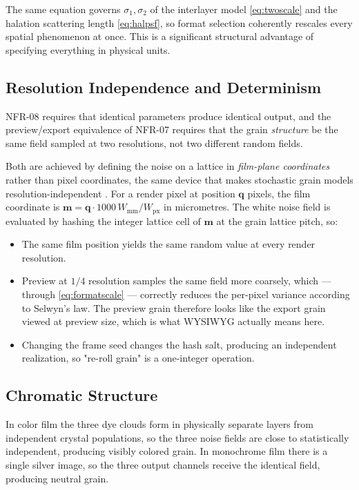 The same equation governs $\sigma_1, \sigma_2$ of the interlayer model
\eqref{eq:twoscale} and the halation scattering length \eqref{eq:halpsf}, so
format selection coherently rescales every spatial phenomenon at once. This is
a significant structural advantage of specifying everything in physical units.

\subsection{Resolution Independence and Determinism}

NFR-08 requires that identical parameters produce identical output, and the
preview/export equivalence of NFR-07 requires that the grain \emph{structure} be
the same field sampled at two resolutions, not two different random fields.

Both are achieved by defining the noise on a lattice in \emph{film-plane
coordinates} rather than pixel coordinates, the same device that makes
stochastic grain models resolution-independent \cite{newson2017}. For a render pixel at position
$\mathbf{q}$ pixels, the film coordinate is $\mathbf{m} = \mathbf{q} \cdot
1000\,W_{\mathrm{mm}} / W_{\mathrm{px}}$ in micrometres. The white noise field is
evaluated by hashing the integer lattice cell of $\mathbf{m}$ at the grain
lattice pitch, so:

\begin{itemize}
\item The same film position yields the same random value at every render
resolution.
\item Preview at $1/4$ resolution samples the same field more coarsely, which
--- through \eqref{eq:formatscale} --- correctly reduces the per-pixel variance
according to Selwyn's law. The preview grain therefore looks like the export
grain viewed at preview size, which is what WYSIWYG actually means here.
\item Changing the frame seed changes the hash salt, producing an independent
realization, so "re-roll grain" is a one-integer operation.
\end{itemize}

\subsection{Chromatic Structure}

In color film the three dye clouds form in physically separate layers from
independent crystal populations, so the three noise fields are close to
statistically independent, producing visibly colored grain. In monochrome film
there is a single silver image, so the three output channels receive the
identical field, producing neutral grain.

